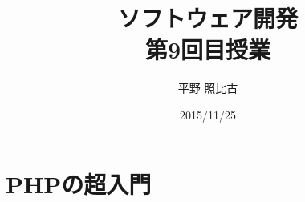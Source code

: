 
\title{ソフトウェア開発\\第9回目授業}
\author{平野 照比古}
\institute{}
\date{2015/11/25}
\newtheorem{Prob}{解説}
\newcommand{\Elm}[1]{\texttt{<#1>}}

\newcommand{\DOMM}{\texttt}
\newcommand{\Event}{\texttt}
\newcommand{\DOMP}{\texttt}
\newcommand{\DOM}{\texttt{DOM}}
\newcommand{\keyitem}{\relax}
\newcommand{\HTML}{HTML文書}

\frame{\maketitle}
\section{PHPの超入門}
